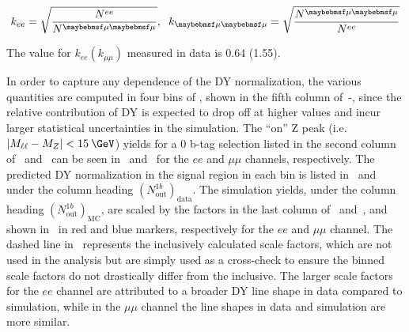 \begin{equation}
  k_{ee} = \sqrt{\frac{N^{ee}}{N^{\mu\mu}}}, \hspace{0.2cm} k_{\mu\mu} = \sqrt{\frac{N^{\mu\mu}}{N^{ee}}}
\end{equation}

The value for $k_{ee} (k_{\mu\mu})$ measured in data is 0.64 (1.55). 

In order to capture any \ptmiss dependence of the DY normalization, the various \Rinout quantities are computed in four bins of \ptmiss, shown in the fifth column of~-, since the relative contribution of DY is expected to drop off at higher \ptmiss values and incur larger statistical uncertainties in the simulation. The ``on'' Z peak (i.e. $|M_{\ell\ell} - M_Z| < 15\:\GeV$) yields for a 0 b-tag selection listed in the second column of~ and~ can be seen in~ and~ for the $ee$ and $\mu\mu$ channels, respectively. The predicted DY normalization in the signal region in each \ptmiss bin is listed in~ and~ under the column heading $(N^{1b}_{\text{out}})_\text{data}$. The simulation yields, under the column heading $(N^{1b}_{\text{out}})_\text{MC}$, are scaled by the factors in the last column of~ and~, and shown in~ in red and blue markers, respectively for the $ee$ and $\mu\mu$ channel. The dashed line in~ represents the inclusively calculated scale factors, which are not used in the analysis but are simply used as a cross-check to ensure the \MET binned scale factors do not drastically differ from the inclusive. The larger scale factors for the $ee$ channel are attributed to a broader DY line shape in data compared to simulation, while in the $\mu\mu$ channel the line shapes in data and simulation are more similar.

